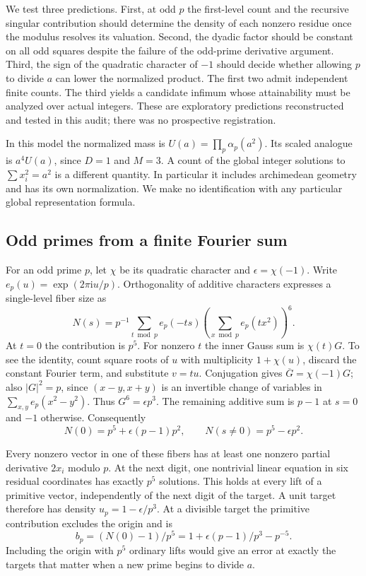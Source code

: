 \documentclass[12pt,letterpaper]{article}
\begin{document}
We test three predictions. First, at odd \(p\) the first-level count and the recursive singular contribution should determine the density of each nonzero residue once the modulus resolves its valuation. Second, the dyadic factor should be constant on all odd squares despite the failure of the odd-prime derivative argument. Third, the sign of the quadratic character of \(-1\) should decide whether allowing \(p\) to divide \(a\) can lower the normalized product. The first two admit independent finite counts. The third yields a candidate infimum whose attainability must be analyzed over actual integers. These are exploratory predictions reconstructed and tested in this audit; there was no prospective registration.

In this model the normalized mass is \(U(a)=\prod_p\alpha_p(a^2)\). Its scaled analogue is \(a^4U(a)\), since \(D=1\) and \(M=3\). A count of the global integer solutions to \(\sum x_i^2=a^2\) is a different quantity. In particular it includes archimedean geometry and has its own normalization. We make no identification with any particular global representation formula.

\clearpage\subsection{Odd primes from a finite Fourier sum}
For an odd prime \(p\), let \(\chi\) be its quadratic character and \(\epsilon=\chi(-1)\). Write \(e_p(u)=\exp(2\pi\mathrm i u/p)\). Orthogonality of additive characters expresses a single-level fiber size as
\[
   N(s)=p^{-1}\sum_{t\bmod p} e_p(-ts)
                    \left(\sum_{x\bmod p} e_p(tx^2)\right)^6.
\]
At \(t=0\) the contribution is \(p^5\). For nonzero \(t\) the inner Gauss sum is \(\chi(t)G\). To see the identity, count square roots of \(u\) with multiplicity \(1+\chi(u)\), discard the constant Fourier term, and substitute \(v=tu\). Conjugation gives \(\overline G=\chi(-1)G\); also \(|G|^2=p\), since \((x-y,x+y)\) is an invertible change of variables in \(\sum_{x,y}e_p(x^2-y^2)\). Thus \(G^6=\epsilon p^3\). The remaining additive sum is \(p-1\) at \(s=0\) and \(-1\) otherwise. Consequently
\[
          N(0)=p^5+\epsilon(p-1)p^2,\qquad
          N(s\ne0)=p^5-\epsilon p^2 .
\]

Every nonzero vector in one of these fibers has at least one nonzero partial derivative \(2x_i\) modulo \(p\). At the next digit, one nontrivial linear equation in six residual coordinates has exactly \(p^5\) solutions. This holds at every lift of a primitive vector, independently of the next digit of the target. A unit target therefore has density \(u_p=1-\epsilon/p^3\). At a divisible target the primitive contribution excludes the origin and is
\[
               b_p=(N(0)-1)/p^5
                   =1+\epsilon(p-1)/p^3-p^{-5}.
\]
Including the origin with \(p^5\) ordinary lifts would give an error at exactly the targets that matter when a new prime begins to divide \(a\).
\end{document}

